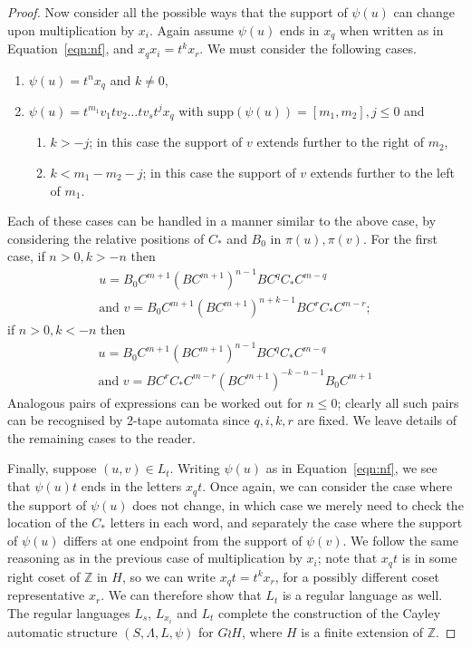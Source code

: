 \documentclass[11pt]{amsart}
\theoremstyle{definition}
\newcommand\Z{\mathbb Z}
\newcommand\support{\mathrm{supp}}
\begin{document}
\begin{proof}
Now consider all the possible ways that the support of $\psi(u)$ can change upon multiplication by $x_i$. Again assume $\psi(u)$  ends in $x_q$ when written as in Equation~\eqref{eqn:nf}, and
$x_qx_i = t^kx_r$.  We must consider the following cases.



\begin{enumerate}\item $  \psi(u)=t^nx_q$ and $k\neq 0$,
\item $\psi(u)=t^{m_1}v_1tv_2\dots tv_st^jx_q$ with  $\support(\psi(u))=[m_1,m_2], j\leq 0$ and
\begin{enumerate}\item $k>-j$; in this case  the support  of $v$ extends  further to the right of $m_2$,
\item $k<m_1-m_2-j$; in this case the  support of $v$  extends  further to the left of $m_1$.
\end{enumerate}

\end{enumerate}
Each of these cases can be handled in a manner similar to the above case, by considering the relative positions of $C_*$ and $B_0$ in $\pi(u),\pi(v)$. 
For the first case, if $n>0,k>-n$ then 
 \begin{equation*}
    \begin{split}
    u= B_0C^{m+1}(BC^{m+1})^{n-1}B C^qC_*C^{m-q} \\\text{and } v=B_0C^{m+1}(BC^{m+1})^{n+k-1}B C^rC_*C^{m-r};  \end{split}
    \end{equation*}
if $n>0,k<-n$ then
 \begin{equation*}
    \begin{split}
    u  =  B_0C^{m+1}(BC^{m+1})^{n-1}B C^qC_*C^{m-q}  \\ \text{and } v = B
C^rC_*C^{m-r}
(BC^{m+1})^{-k-n-1}B_0C^{m+1}
    \end{split}
    \end{equation*}
 Analogous pairs of expressions can be worked out for $n\leq 0$; clearly all such pairs can be recognised by 2-tape automata  since $q,i,k,r$ are fixed.
We leave details of the remaining cases to the reader.






Finally, 
suppose $(u,v) \in L_{t}$.
Writing $\psi(u)$ as in Equation~\eqref{eqn:nf}, we see that $\psi(u)t$ ends in the letters $x_qt$. Once again, we can consider the case where the support of $\psi(u)$ does not change, in which case we merely need to check the location of the $C_*$ letters in each word, 
and separately the case where the support of $\psi(u)$ differs at one endpoint from the support of $\psi(v)$.
We follow the same reasoning as in the previous case of multiplication by $x_i$; note that $x_qt$ is in some right coset of $\Z$ in $H$, so we can write $x_qt = t^kx_r$, for a possibly different coset representative $x_r$.
We can  therefore show that  $L_t$ is a regular language as well.
The regular languages $L_s$, $L_{x_i}$ and $L_t$ complete the construction of the Cayley automatic structure
$(S,\Lambda,L,\psi)$ for $G \wr H$, where $H$ is a finite extension of $\Z$.
\end{proof}
\end{document}
